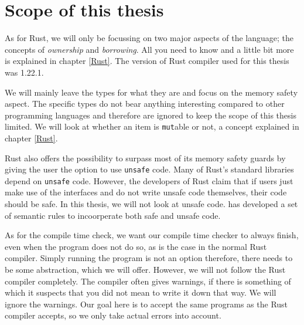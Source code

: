 



\section{Scope of this thesis}
As for Rust, we will only be focussing on two major aspects of the language; the concepts of \emph{ownership} and \emph{borrowing}. All you need to know and a little bit more is explained in chapter \ref{Rust}. The version of Rust compiler used for this thesis was 1.22.1. 

We will mainly leave the types for what they are and focus on the memory safety aspect. The specific types do not bear anything interesting compared to other programming languages and therefore are ignored to keep the scope of this thesis limited. We will look at whether an item is \texttt{mut}able or not, a concept explained in chapter \ref{Rust}. 

Rust also offers the possibility to surpass most of its memory safety guards by giving the user the option to use \texttt{unsafe} code. Many of Rust's standard libraries depend on \texttt{unsafe} code. However, the developers of Rust claim that if users just make use of the interfaces and do not write unsafe code themselves, their code should be safe. In this thesis, we will not look at unsafe code. \cite{jung2017rustbelt} has developed a set of semantic rules to incoorperate both safe and unsafe code. 

As for the compile time check, we want our compile time checker to always finish, even when the program does not do so, as is the case in the normal Rust compiler. Simply running the program is not an option therefore, there needs to be some abstraction, which we will offer. However, we will not follow the Rust compiler completely. The compiler often gives warnings, if there is something of which it suspects that you did not mean to write it down that way. We will ignore the warnings. Our goal here is to accept the same programs as the Rust compiler accepts, so we only take actual errors into account. 

